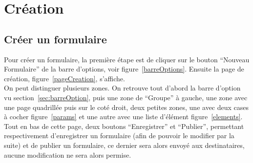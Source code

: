 \documentclass[a4paper,11pt,final]{report}
\begin{document}
\chapter{Création}
\section{Créer un formulaire}\label{CreerFormulaire}
Pour créer un formulaire, la première étape est de cliquer sur le bouton ``Nouveau Formulaire'' de la barre d'options, voir figure~\ref{barreOptions}. Ensuite la page de création, figure~\ref{pageCreation}, s'affiche.\\
On peut distinguer plusieurs zones. On retrouve tout d'abord la barre d'option vu section~\ref{sec:barreOption}, puis une zone de ``Groupe'' à gauche, une zone avec une page quadrillée puis sur le coté droit, deux petites zones, une avec deux cases à cocher figure~\ref{params} et une autre avec une liste d'élément figure~\ref{elements}.\\
Tout en bas de cette page, deux boutons ``Enregistrer'' et ``Publier'', permettant respectivement d'enregistrer un formulaire (afin de pouvoir le modifier par la suite) et de publier un formulaire, ce dernier sera alors envoyé aux destinataires, aucune modification ne sera alors permise.

\noindent\begin{minipage}{\linewidth}%
\label{pageCreation}
\end{minipage}
\end{document}
